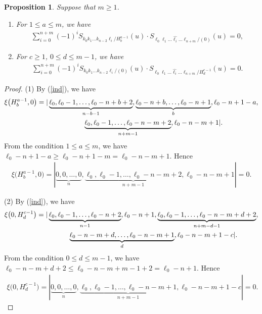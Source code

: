 \documentclass[10pt,a4paper]{amsart}
\numberwithin{equation}{section}
\newtheorem{Proposition}[Theorem]{Proposition}
 { \theoremstyle{definition}
\newtheorem{Definition}[Theorem]{Definition}
\newtheorem{Note}[Theorem]{Note}
\newtheorem{Example}[Theorem]{Example}
\newtheorem{Remark}[Theorem]{Remark} }
\begin{document}
\begin{Proposition}\label{00}\samepage
Suppose that $m \geq 1$.
\begin{enumerate}
\item[$(1)$] For $1\leq a\leq m$, we have\
\begin{gather*}
\sum_{i=0}^{n+m}{(-1)}^{i}S_{k_0 k_1\dots k_{n-2}\ell_i/{H^{a-1}_{b}}}(u)\cdot S_{\ell_0 \ell_1\dots \widehat{\ell_{i}}\dots\ell_{n+m}/{(0)}}(u)=0,%
\end{gather*}
\item[$(2)$] For $c\geq 1$, $0\leq d \leq m-1$, we have\
\begin{gather*}
\sum_{i=0}^{n+m}{(-1)}^{i}S_{k_0 k_1\dots k_{n-2}\ell_i/{(0)}}(u)\cdot S_{\ell_0 \ell_1\dots \widehat{\ell_{i}}\dots\ell_{n+m}/{H^{c-1}_{d}}}(u)=0.%
\end{gather*}
\end{enumerate}
\end{Proposition}
\begin{proof}
(1) By (\ref{ind}), we have
\begin{gather*}
\xi\bigl(H^{a-1}_{b},0\bigr)=|\underbrace{\ell_{0},\ell_{0}-1,\dots,\ell_{0}-n+b+2}_{n-b-1},\underbrace{\ell_{0}-n+b,\dots,\ell_{0}-n+1}_{b},\ell_{0}-n+1-a,\nonumber\\
\hphantom{\xi\bigl(H^{a-1}_{b},0\bigr)=|}{}
\underbrace{\ell_{0},\ell_{0}-1,\dots,\ell_{0}-n-m+2}_{n+m-1},\ell_{0}-n-m+1|.\nonumber
\end{gather*}
From the condition $1\leq a\leq m$, we have $\ell_0-n+1-a\geq\ell_{0}-n+1-m=\ell_{0}-n-m+1$. Hence
\begin{gather*}
\xi\bigl(H^{a-1}_{b},0\bigr)=|\underbrace{0,0,\dots,0}_{n},\underbrace{\ell_{0},\ell_{0}-1,\dots,\ell_{0}-n-m+2}_{n+m-1},\ell_{0}-n-m+1|=0.\nonumber
\end{gather*}

(2) By (\ref{ind}), we have
\begin{gather*}
\xi\bigl(0,H^{c-1}_{d}\bigr)=|\underbrace{\ell_{0},\ell_{0}-1,\dots,\ell_{0}-n+2}_{n-1},\ell_{0}-n+1,
\underbrace{\ell_{0},\ell_{0}-1,\dots,\ell_{0}-n-m+d+2}_{n+m-d-1},\nonumber\\
\hphantom{\xi\bigl(0,H^{c-1}_{d}\bigr)=|}{}
\underbrace{\ell_{0}-n-m+d,\dots,\ell_{0}-n-m+1}_{d},\ell_{0}-n-m+1-c|\nonumber.
\end{gather*}
From the condition $0\leq d \leq m-1$, we have $\ell_0-n-m+d+2\leq\ell_{0}-n-m+m-1+2=\ell_{0}-n+1$. Hence
\begin{gather*}
\xi\bigl(0,H^{c-1}_{d}\bigr)=|\underbrace{0,0,\dots,0}_{n},\underbrace{\ell_{0},\ell_{0}-1,\dots,\ell_{0}-n-m+1}_{n+m-1},\ell_{0}-n-m+1-c|=0.
\tag*{\qed}
\end{gather*}
\renewcommand{\qed}{}
\end{proof}
\end{document}
